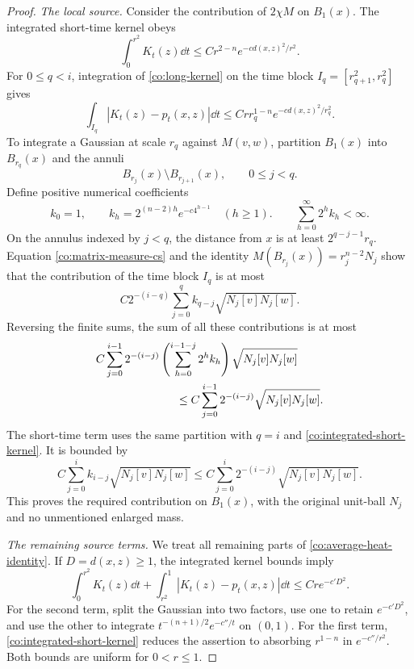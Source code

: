 \begin{proof}
\smallskip\noindent
\emph{The local source.}
Consider the contribution of \(2\chi M\) on \(B_1(x)\).
The integrated short-time kernel obeys
\begin{equation}\label{co:integrated-short-kernel}
 \int_0^{r^2}K_t(z)\dd t
 \le Cr^{2-n}e^{-c d(x,z)^2/r^2}.
\end{equation}
For \(0\le q<i\), integration of
\eqref{co:long-kernel} on the time block
\(I_q=[r_{q+1}^2,r_q^2]\) gives
\begin{equation}\label{co:integrated-long-kernel}
 \int_{I_q}|K_t(z)-p_t(x,z)|\dd t
 \le Cr r_q^{1-n}e^{-c d(x,z)^2/r_q^2}.
\end{equation}
To integrate a Gaussian at scale \(r_q\) against \(M(v,w)\),
partition \(B_1(x)\) into \(B_{r_q}(x)\) and the annuli
\[
 B_{r_j}(x)\setminus B_{r_{j+1}}(x),\qquad 0\le j<q.
\]
Define positive numerical coefficients
\begin{equation}\label{co:gaussian-shell-coefficients}
 k_0=1,\qquad
 k_h=2^{(n-2)h}e^{-c4^{h-1}}\quad(h\ge1).
 \qquad \sum_{h=0}^\infty2^h k_h<\infty.
\end{equation}
On the annulus indexed by \(j<q\), the distance from \(x\) is at
least \(2^{q-j-1}r_q\).  Equation
\eqref{co:matrix-measure-cs} and the identity
\(M(B_{r_j}(x))=r_j^{n-2}N_j\) show that the contribution of the
time block \(I_q\) is at most
\[
 C2^{-(i-q)}\sum_{j=0}^q k_{q-j}
                       \sqrt{N_j[v]N_j[w]}.
\]
Reversing the finite sums, the sum of all these contributions is
at most
\begin{align*}
 &C\sum_{j=0}^{i-1}2^{-(i-j)}
       \left(\sum_{h=0}^{i-1-j}2^h k_h\right)
                       \sqrt{N_j[v]N_j[w]}\\
 &\hspace{25mm}\le
 C\sum_{j=0}^{i-1}2^{-(i-j)}\sqrt{N_j[v]N_j[w]}.
\end{align*}
The short-time term uses the same partition with \(q=i\) and
\eqref{co:integrated-short-kernel}.  It is bounded by
\[
 C\sum_{j=0}^i k_{i-j}\sqrt{N_j[v]N_j[w]}
 \le C\sum_{j=0}^i2^{-(i-j)}\sqrt{N_j[v]N_j[w]}.
\]
This proves the required contribution on \(B_1(x)\), with the
original unit-ball \(N_j\) and no unmentioned enlarged mass.

\smallskip\noindent
\emph{The remaining source terms.}
We treat all remaining parts of
\eqref{co:average-heat-identity}.  If \(D=d(x,z)\ge1\), the
integrated kernel bounds imply
\begin{equation}\label{co:exterior-integrated-kernel}
 \int_0^{r^2}K_t(z)\dd t+
 \int_{r^2}^1|K_t(z)-p_t(x,z)|\dd t
 \le Cr e^{-c'D^2}.
\end{equation}
For the second term, split the Gaussian into two factors, use
one to retain \(e^{-c'D^2}\), and use the other to integrate
\(t^{-(n+1)/2}e^{-c''/t}\) on \((0,1)\).  For the first term,
\eqref{co:integrated-short-kernel} reduces the assertion to
absorbing \(r^{1-n}\) in \(e^{-c''/r^2}\).  Both bounds are uniform
for \(0<r\le1\).


\end{proof}
